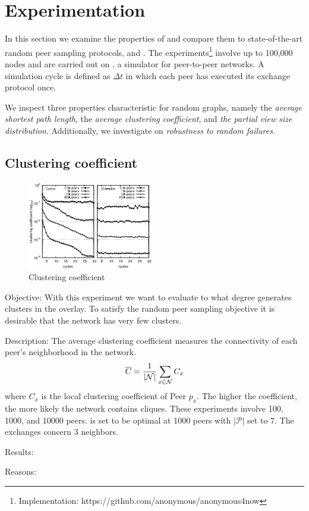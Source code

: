 
\section{Experimentation}
\label{sec:experiments}
In this section we examine the properties of \SCAMPLON{} and 
compare them to state-of-the-art random peer sampling protocols, \SCAMP{} and \CYCLON{}. 
The experiments\footnote{Implementation: https://github.com/anonymous/anonymous4now}
involve up to 100,000 nodes and are carried out on \PEERSIM{} \cite{peersim}, 
a simulator for peer-to-peer networks.
A simulation cycle is defined as $\Delta t$ in which each peer has executed its exchange protocol once.

We inspect three properties characteristic for random graphs, namely the
\emph{average shortest path length}, the \emph{average clustering coefficient},
and \emph{the partial view size distribution}. Additionally, we investigate on
\emph{robustness to random failures}.

\subsection{Clustering coefficient}

\begin{figure}
    \centering
    \includegraphics[width=0.49\textwidth]{img/cluster.eps}
    \caption{Clustering coefficient}
    \label{fig:clustering}
\end{figure}


\begin{asparadesc}
\item[Objective:]
    With this experiment we want to evaluate to what degree \SCAMPLON{} generates clusters in the overlay.
    To satisfy the random peer sampling objective it is desirable that the network has very few clusters.
\item[Description:] 
   The average clustering coefficient measures the connectivity of each peer's neighborhood in the network.
  \begin{equation}
    \overline{C} = {1\over |\mathcal{N}|}\sum\limits_{x\in\mathcal{N}}C_x
    \end{equation}
    where $C_x$ is the local clustering coefficient of Peer $p_x$. The higher
    the coefficient, the more likely the network contains cliques. These
    experiments involve 100, 1000, and 10000 peers. \CYCLON{} is set to be optimal
    at 1000 peers with $|\mathcal{P}|$ set to $7$. The exchanges concern $3$
    neighbors.
\item[Results:]



\item[Reasons:]
\end{asparadesc}



